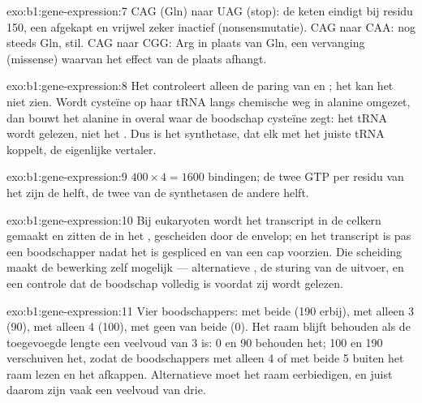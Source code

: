 \begin{solution}{exo:b1:gene-expression:7}
CAG (Gln) naar UAG (stop): de keten eindigt bij residu 150, een afgekapt en vrijwel
zeker inactief  (nonsensmutatie). CAG naar CAA: nog steeds Gln, stil. CAG naar
CGG: Arg in plaats van Gln, een vervanging (missense) waarvan het effect van de
plaats afhangt.
\end{solution}

\begin{solution}{exo:b1:gene-expression:8}
Het  controleert alleen de paring van  en ; het kan het
 niet zien. Wordt cysteïne op haar tRNA langs chemische weg in alanine
omgezet, dan bouwt het  alanine in overal waar de boodschap cysteïne zegt:
het tRNA wordt gelezen, niet het . Dus is het synthetase, dat elk 
met het juiste tRNA koppelt, de eigenlijke vertaler.
\end{solution}

\begin{solution}{exo:b1:gene-expression:9}
$400\times 4 = 1600$ bindingen; de twee GTP per residu van het  zijn de
helft, de twee van de synthetasen de andere helft.
\end{solution}

\begin{solution}{exo:b1:gene-expression:10}
Bij eukaryoten wordt het transcript in de celkern gemaakt en zitten de  in
het , gescheiden door de envelop; en het transcript is pas een boodschapper
nadat het is gespliced en van een cap voorzien. Die scheiding maakt de bewerking
zelf mogelijk --- alternatieve , de sturing van de uitvoer, en een controle
dat de boodschap volledig is voordat zij wordt gelezen.
\end{solution}

\begin{solution}{exo:b1:gene-expression:11}
Vier boodschappers: met beide  (190  erbij), met alleen 3 (90),
met alleen 4 (100), met geen van beide (0). Het raam blijft behouden als de
toegevoegde lengte een veelvoud van 3 is: 0 en 90 behouden het; 100 en 190
verschuiven het, zodat de boodschappers met alleen  4 of met beide  
5 buiten het raam lezen en het  afkappen. Alternatieve  moet het raam
eerbiedigen, en juist daarom zijn  vaak een veelvoud van drie.
\end{solution}

